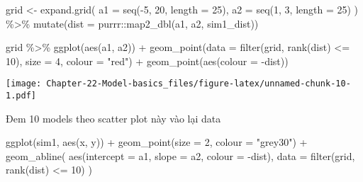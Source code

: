 \documentclass[
]{article}
\newenvironment{Shaded}{\begin{snugshade}}{\end{snugshade}}
\newcommand{\AttributeTok}[1]{\textcolor[rgb]{0.77,0.63,0.00}{#1}}
\newcommand{\DecValTok}[1]{\textcolor[rgb]{0.00,0.00,0.81}{#1}}
\newcommand{\FunctionTok}[1]{\textcolor[rgb]{0.00,0.00,0.00}{#1}}
\newcommand{\NormalTok}[1]{#1}
\newcommand{\OtherTok}[1]{\textcolor[rgb]{0.56,0.35,0.01}{#1}}
\newcommand{\SpecialCharTok}[1]{\textcolor[rgb]{0.00,0.00,0.00}{#1}}
\newcommand{\StringTok}[1]{\textcolor[rgb]{0.31,0.60,0.02}{#1}}
\begin{document}
\begin{Shaded}
\begin{Highlighting}[]
\NormalTok{grid }\OtherTok{\textless{}{-}} \FunctionTok{expand.grid}\NormalTok{(}
  \AttributeTok{a1 =} \FunctionTok{seq}\NormalTok{(}\SpecialCharTok{{-}}\DecValTok{5}\NormalTok{, }\DecValTok{20}\NormalTok{, }\AttributeTok{length =} \DecValTok{25}\NormalTok{),}
  \AttributeTok{a2 =} \FunctionTok{seq}\NormalTok{(}\DecValTok{1}\NormalTok{, }\DecValTok{3}\NormalTok{, }\AttributeTok{length =} \DecValTok{25}\NormalTok{)}
\NormalTok{  ) }\SpecialCharTok{\%\textgreater{}\%} 
  \FunctionTok{mutate}\NormalTok{(}\AttributeTok{dist =}\NormalTok{ purrr}\SpecialCharTok{::}\FunctionTok{map2\_dbl}\NormalTok{(a1, a2, sim1\_dist))}

\NormalTok{grid }\SpecialCharTok{\%\textgreater{}\%} 
  \FunctionTok{ggplot}\NormalTok{(}\FunctionTok{aes}\NormalTok{(a1, a2)) }\SpecialCharTok{+}
  \FunctionTok{geom\_point}\NormalTok{(}\AttributeTok{data =} \FunctionTok{filter}\NormalTok{(grid, }\FunctionTok{rank}\NormalTok{(dist) }\SpecialCharTok{\textless{}=} \DecValTok{10}\NormalTok{), }\AttributeTok{size =} \DecValTok{4}\NormalTok{, }\AttributeTok{colour =} \StringTok{"red"}\NormalTok{) }\SpecialCharTok{+}
  \FunctionTok{geom\_point}\NormalTok{(}\FunctionTok{aes}\NormalTok{(}\AttributeTok{colour =} \SpecialCharTok{{-}}\NormalTok{dist)) }
\end{Highlighting}
\end{Shaded}

\texttt{[image: Chapter-22-Model-basics\_files/figure-latex/unnamed-chunk-10-1.pdf]}

Đem 10 models theo scatter plot này vào lại data

\begin{Shaded}
\begin{Highlighting}[]
\FunctionTok{ggplot}\NormalTok{(sim1, }\FunctionTok{aes}\NormalTok{(x, y)) }\SpecialCharTok{+} 
  \FunctionTok{geom\_point}\NormalTok{(}\AttributeTok{size =} \DecValTok{2}\NormalTok{, }\AttributeTok{colour =} \StringTok{"grey30"}\NormalTok{) }\SpecialCharTok{+} 
  \FunctionTok{geom\_abline}\NormalTok{(}
    \FunctionTok{aes}\NormalTok{(}\AttributeTok{intercept =}\NormalTok{ a1, }\AttributeTok{slope =}\NormalTok{ a2, }\AttributeTok{colour =} \SpecialCharTok{{-}}\NormalTok{dist), }
    \AttributeTok{data =} \FunctionTok{filter}\NormalTok{(grid, }\FunctionTok{rank}\NormalTok{(dist) }\SpecialCharTok{\textless{}=} \DecValTok{10}\NormalTok{)}
\NormalTok{  )}
\end{Highlighting}
\end{Shaded}
\end{document}
